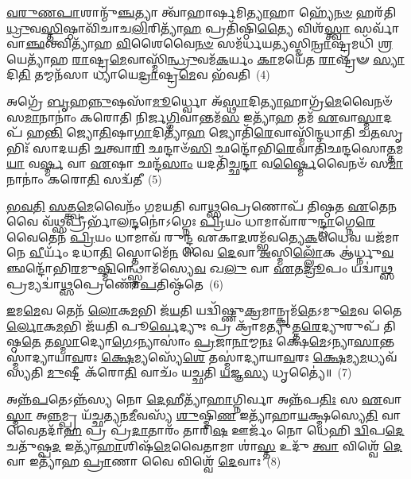 \-\ul{𑌵}\-\-\ul{𑌰𑍁}\-\-\ul{𑌣}\-\-\ul{𑌪𑌾}\-𑌶𑌾𑌨𑍍𑌮𑍁᳴\-\ul{𑌞𑍍𑌚}\-𑌤𑍍𑌯𑌾 𑌤𑍍𑌵𑌾᳴𑌹𑌾𑌰𑍍\mbox{}\-\ul{𑌷}\-𑌮𑌿\-\ul{𑌤𑍍𑌯𑌾}\-𑌹𑌾 𑌹𑍍𑌯𑍇᳴\-\ul{𑌨}\-\-\ul{𑍞} 𑌹𑌰᳴𑌤𑌿 \ul{𑌧𑍍𑌰𑍁}\-𑌵\-\ul{𑌸𑍍𑌤𑌿}\-𑌷𑍍𑌠𑌾𑌵𑌿᳴𑌚𑌾𑌚\-\ul{𑌲𑌿}\-𑌰𑌿𑌤𑍍𑌯𑌾᳴\-\ul{𑌹} 𑌪𑍍𑌰𑌤𑌿᳴𑌷𑍍𑌠𑌿\-\ul{𑌤𑍍𑌯𑍈} 𑌵𑌿𑌶᳴\-\ul{𑌸𑍍𑌤𑍍𑌵𑌾} 𑌸𑌰𑍍𑌵𑌾᳴ 𑌵𑌾\-\ul{𑌞𑍍𑌛}\-𑌨𑍍𑌤𑍍𑌵𑌿𑌤𑍍𑌯𑌾᳴𑌹 \ul{𑌵𑌿}\-𑌶𑍈𑌵𑍈\-\ul{𑌨}\-\-\ul{𑍞} 𑌸𑌮᳴𑌰𑍍𑌧𑌯\-\ul{𑌤𑍍𑌯}\-𑌸𑍍𑌮𑌿\-\ul{𑌨𑍍𑌰𑌾}\-𑌷𑍍𑌟𑍍𑌰𑌮𑌧𑌿᳴ \ul{𑌶𑍍𑌰}\-𑌯𑍇𑌤𑍍𑌯𑌾᳴𑌹 \ul{𑌰𑌾}\-𑌷𑍍𑌟𑍍𑌰\-\ul{𑌮𑍇}\-𑌵𑌾𑌸𑍍𑌮𑌿᳴\-\ul{𑌨𑍍𑌧𑍍𑌰𑍁}\-𑌵𑌮᳴\-\ul{𑌕}\-𑌰𑍍𑌯𑌂 \ul{𑌕𑌾}\-𑌮𑌯𑍇᳴𑌤 \ul{𑌰𑌾}\-𑌷𑍍𑌟𑍍𑌰𑍟 \ul{𑌸𑍍𑌯𑌾}\-𑌦𑌿\-\ul{𑌤𑌿} 𑌤𑌮𑍍𑌮𑌨᳴𑌸𑌾 𑌧𑍍𑌯𑌾𑌯𑍇\-\ul{𑌦𑍍𑌰𑌾}\-𑌷𑍍𑌟𑍍𑌰\-\ul{𑌮𑍇}\-𑌵 𑌭᳴𑌵𑌤𑌿~(4)

𑌅𑌗𑍍𑌰𑍇᳴ \ul{𑌬𑍃}\-𑌹\-\ul{𑌨𑍍𑌨𑍁}\-𑌷𑌸𑌾᳴\-\ul{𑌮𑍂}\-𑌰𑍍𑌧𑍍𑌵𑍋 𑌅᳴\-\ul{𑌸𑍍𑌥𑌾}\-𑌦𑌿\-\ul{𑌤𑍍𑌯𑌾}\-𑌹𑌾𑌗𑍍𑌰᳴\-\ul{𑌮𑍇}\-𑌵𑍈𑌨𑍞᳴ 𑌸\-\ul{𑌮𑌾}\-𑌨𑌾𑌨𑌾𑌂॑ 𑌕𑌰𑍋𑌤𑌿 𑌨𑌿𑌰𑍍𑌜\-\ul{𑌗𑍍𑌮𑌿}\-𑌵𑌾𑌨𑍍𑌤𑌮᳴\-\ul{𑌸} 𑌇𑌤𑍍𑌯𑌾᳴\-\ul{𑌹} 𑌤𑌮᳴ \ul{𑌏}\-𑌵𑌾\-\ul{𑌸𑍍𑌮𑌾}\-𑌦𑌪᳴ 𑌹\-\ul{𑌨𑍍𑌤𑌿} 𑌜𑍍𑌯𑍋\-\ul{𑌤𑌿}\-𑌷𑌾\-\ul{𑌗𑌾}\-𑌦𑌿𑌤𑍍𑌯𑌾᳴\-\ul{𑌹} 𑌜𑍍𑌯𑍋𑌤𑌿᳴\-\ul{𑌰𑍇}\-𑌵𑌾𑌸𑍍𑌮𑌿᳴𑌨𑍍𑌦𑌧𑌾𑌤𑌿 𑌚\-\ul{𑌤}\-𑌸𑍃𑌭𑌿𑌃᳴ 𑌸𑌾𑌦𑌯𑌤𑌿 \ul{𑌚}\-𑌤𑍍𑌵𑌾\-\ul{𑌰𑌿} 𑌛𑌨𑍍𑌦𑌾𑍞᳴\-\ul{𑌸𑌿} 𑌛𑌨𑍍𑌦𑍋᳴𑌭𑌿\-\ul{𑌰𑍇}\-𑌵𑌾𑌤𑌿᳴𑌛𑌨𑍍𑌦𑌸𑍋\-\ul{𑌤𑍍𑌤}\-𑌮\-\ul{𑌯𑌾} 𑌵\-\ul{𑌰𑍍𑌷𑍍𑌮} 𑌵𑌾 \ul{𑌏}\-𑌷𑌾 𑌛𑌨𑍍𑌦᳴\-\ul{𑌸𑌾𑌂} 𑌯𑌦𑌤𑌿᳴𑌚𑍍𑌛\-\ul{𑌨𑍍𑌦𑌾} 𑌵\-\ul{𑌰𑍍𑌷𑍍𑌮𑍈}\-𑌵𑍈𑌨𑍞᳴ 𑌸\-\ul{𑌮𑌾}\-𑌨𑌾𑌨𑌾𑌂॑ 𑌕𑌰𑍋\-\ul{𑌤𑌿} 𑌸𑌦𑍍𑌵᳴𑌤𑍀~(5)

\-\ul{𑌭}\-\-\ul{𑌵}\-\-\ul{𑌤𑌿} \ul{𑌸}\-𑌤𑍍𑌤𑍍𑌵\-\ul{𑌮𑍇}\-𑌵𑍈𑌨𑌂᳴ 𑌗𑌮𑌯𑌤𑌿 𑌵𑌾\-\ul{𑌥𑍍𑌸}\-𑌪𑍍𑌰𑍇𑌣𑍋𑌪᳴ 𑌤𑌿𑌷𑍍𑌠𑌤 \ul{𑌏}\-𑌤𑍇\-\ul{𑌨} 𑌵𑍈 𑌵᳴\-\ul{𑌥𑍍𑌸}\-𑌪𑍍𑌰𑍀𑌰𑍍𑌭𑌾᳴𑌲\-\ul{𑌨𑍍𑌦}\-𑌨𑍋॑\-𑌽𑌗𑍍𑌨𑍇𑌃 \ul{𑌪𑍍𑌰𑌿}\-𑌯𑌂 𑌧𑌾𑌮𑌾𑌵𑌾᳴𑌰𑍁\-\ul{𑌨𑍍𑌦𑍍𑌧𑌾}\-𑌗𑍍𑌨𑍇\-\ul{𑌰𑍇}\-𑌵𑍈𑌤𑍇𑌨᳴ \ul{𑌪𑍍𑌰𑌿}\-𑌯𑌂 𑌧𑌾𑌮𑌾𑌵᳴ 𑌰𑍁𑌨𑍍𑌦𑍍𑌧 𑌏𑌕𑌾\-\ul{𑌦}\-𑌶𑌮𑍍𑌭᳴𑌵𑌤𑍍𑌯𑍇\-\ul{𑌕}\-𑌧𑍈𑌵 𑌯𑌜᳴𑌮𑌾𑌨𑍇 \ul{𑌵𑍀}\-𑌰𑍍𑌯𑌂᳴ 𑌦𑌧𑌾\-\ul{𑌤𑌿} 𑌸𑍍𑌤𑍋𑌮𑍇᳴\-\ul{𑌨} 𑌵𑍈 \ul{𑌦𑍇}\-𑌵𑌾 \ul{𑌅}\-𑌸𑍍𑌮𑌿\-\ul{𑌲𑍍𑌲𑍋𑌁}\-𑌕 𑌆॑𑌰𑍍𑌧𑍍𑌨𑍁\-\ul{𑌵}\-𑌞𑍍𑌛𑌨𑍍𑌦𑍋᳴𑌭𑌿\-\ul{𑌰}\-𑌮𑍁\-\ul{𑌷𑍍𑌮𑌿}\-𑌨𑍍𑌥𑍍𑌸𑍍𑌤𑍋𑌮᳴𑌸𑍍𑌯𑍇\-\ul{𑌵} 𑌖\-\ul{𑌲𑍁} 𑌵𑌾 \ul{𑌏}\-𑌤\-\ul{𑌦𑍍𑌰𑍂}\-𑌪𑌂 𑌯𑌦𑍍𑌵𑌾॑\-\ul{𑌥𑍍𑌸}\-𑌪𑍍𑌰𑌮𑍍𑌯𑌦𑍍𑌵𑌾॑\-\ul{𑌥𑍍𑌸}\-𑌪𑍍𑌰𑍇𑌣𑍋᳴\-\ul{𑌪}\-𑌤𑌿𑌷𑍍𑌠᳴𑌤𑍇~(6)

\-\ul{𑌇}\-𑌮\-\ul{𑌮𑍇}\-𑌵 𑌤𑍇𑌨᳴ \ul{𑌲𑍋}\-𑌕\-\ul{𑌮}\-𑌭𑌿 𑌜᳴\-\ul{𑌯}\-𑌤𑌿 𑌯𑌦𑍍𑌵𑌿᳴𑌷𑍍𑌣𑍁\-\ul{𑌕𑍍𑌰}\-𑌮𑌾𑌨𑍍𑌕𑍍𑌰𑌮᳴\-\ul{𑌤𑍇}\-\-𑌽𑌮𑍁\-\ul{𑌮𑍇}\-𑌵 𑌤𑍈\-\ul{𑌰𑍍𑌲𑍋}\-𑌕\-\ul{𑌮}\-𑌭𑌿 𑌜᳴𑌯𑌤𑌿 𑌪𑍂\-\ul{𑌰𑍍𑌵𑍇}\-𑌦𑍍𑌯𑍁𑌃 𑌪𑍍𑌰 𑌕𑍍𑌰𑌾᳴𑌮𑌤𑍍𑌯𑍁𑌤𑍍𑌤\-\ul{𑌰𑍇}\-𑌦𑍍𑌯𑍁𑌰𑍁𑌪᳴ 𑌤𑌿𑌷𑍍𑌠\-\ul{𑌤𑍇} 𑌤\-\ul{𑌸𑍍𑌮𑌾}\-𑌦𑍍𑌯𑍋\-\ul{𑌗𑍇}\-\-𑌽𑌨𑍍𑌯𑌾𑌸𑌾𑌂॑ \ul{𑌪𑍍𑌰}\-𑌜𑌾\-\ul{𑌨𑌾}\-𑌮𑍍𑌮\-\ul{𑌨𑌃} 𑌕𑍍𑌷𑍇\-\ul{𑌮𑍇}\-\-𑌽𑌨𑍍𑌯𑌾\-\ul{𑌸𑌾}\-𑌨𑍍𑌤𑌸𑍍𑌮𑌾॑𑌦𑍍𑌯𑌾𑌯𑌾\-\ul{𑌵}\-𑌰𑌃 \ul{𑌕𑍍𑌷𑍇}\-𑌮𑍍𑌯𑌸𑍍𑌯𑍇᳴\-\ul{𑌶𑍇} 𑌤𑌸𑍍𑌮𑌾॑𑌦𑍍𑌯𑌾𑌯𑌾\-\ul{𑌵}\-𑌰𑌃 \ul{𑌕𑍍𑌷𑍇}\-𑌮𑍍𑌯\-\ul{𑌮}\-𑌧𑍍𑌯𑌵᳴𑌸𑍍𑌯𑌤𑌿 \ul{𑌮𑍁}\-𑌷𑍍𑌟𑍀 𑌕᳴𑌰𑍋\-\ul{𑌤𑌿} 𑌵𑌾𑌚𑌂᳴ 𑌯𑌚𑍍𑌛𑌤𑌿 \ul{𑌯}\-𑌜𑍍𑌞\-\ul{𑌸𑍍𑌯} 𑌧𑍃𑌤𑍍𑌯𑍈॑॥~(7)

{\anuvakamend[{\-\ul{𑌸𑍃}\-𑌷𑍍𑌟𑍋\-𑌽𑌭𑍍𑌯𑍇᳴𑌤𑌯𑌾᳴ 𑌭𑌵\-\ul{𑌤𑌿} 𑌸𑌦𑍍𑌵᳴𑌤𑍍𑌯𑍁\-\ul{𑌪}\-𑌤𑌿𑌷𑍍𑌠᳴\-\ul{𑌤𑍇} 𑌦𑍍𑌵𑌿𑌚᳴𑌤𑍍𑌵𑌾𑌰𑌿𑍞𑌶𑌚𑍍𑌚}]}%

𑌅𑌨𑍍𑌨᳴\-\ul{𑌪}\-𑌤𑍇\-𑌽𑌨𑍍𑌨᳴𑌸𑍍𑌯 𑌨𑍋 \ul{𑌦𑍇}\-𑌹𑍀𑌤𑍍𑌯𑌾᳴\-\ul{𑌹𑌾}\-𑌗𑍍𑌨𑌿𑌰𑍍𑌵𑌾 𑌅𑌨𑍍𑌨᳴𑌪\-\ul{𑌤𑌿𑌃} 𑌸 \ul{𑌏}\-𑌵𑌾\-\ul{𑌸𑍍𑌮𑌾} 𑌅\-\ul{𑌨𑍍𑌨}\-𑌮𑍍𑌪𑍍𑌰 𑌯᳴𑌚𑍍𑌛𑌤𑍍𑌯𑌨\-\ul{𑌮𑍀}\-𑌵𑌸𑍍𑌯᳴ \ul{𑌶𑍁}\-𑌷𑍍𑌮𑌿\-\ul{𑌣} 𑌇𑌤𑍍𑌯𑌾᳴𑌹𑌾\-\ul{𑌯}\-𑌕𑍍𑌷𑍍𑌮𑌸𑍍𑌯𑍇\-\ul{𑌤𑌿} 𑌵𑌾𑌵𑍈𑌤𑌦𑌾᳴\-\ul{𑌹} 𑌪𑍍𑌰 𑌪𑍍𑌰᳴\-\ul{𑌦𑌾}\-𑌤𑌾𑌰𑌂᳴ 𑌤𑌾𑌰𑌿\-\ul{𑌷} 𑌊𑌰𑍍𑌜𑌂᳴ 𑌨𑍋 𑌧𑍇𑌹𑌿 \ul{𑌦𑍍𑌵𑌿}\-𑌪\-\ul{𑌦𑍇} 𑌚𑌤𑍁᳴𑌷𑍍𑌪\-\ul{𑌦} 𑌇𑌤𑍍𑌯𑌾᳴\-\ul{𑌹𑌾}\-𑌶𑌿𑌷᳴\-\ul{𑌮𑍇}\-𑌵𑍈𑌤𑌾𑌮𑌾 𑌶𑌾॑\-\ul{𑌸𑍍𑌤} 𑌉𑌦𑍁᳴ \ul{𑌤𑍍𑌵𑌾} 𑌵𑌿𑌶𑍍𑌵𑍇᳴ \ul{𑌦𑍇}\-𑌵𑌾 𑌇𑌤𑍍𑌯𑌾᳴𑌹 \ul{𑌪𑍍𑌰𑌾}\-𑌣𑌾 𑌵𑍈 𑌵𑌿𑌶𑍍𑌵𑍇᳴ \ul{𑌦𑍇}\-𑌵𑌾𑌃~(8)

